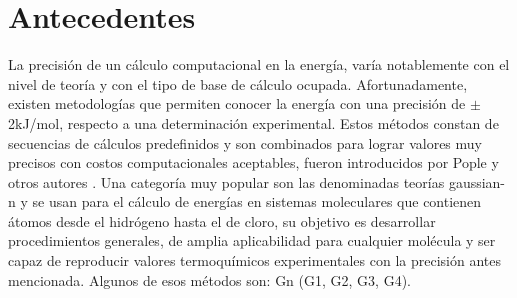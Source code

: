 \documentclass[12pt]{article}
\begin{document}
\section*{Antecedentes}
La precisión de un cálculo computacional en la energía, varía notablemente con el nivel de teoría y con el tipo de base de cálculo ocupada. Afortunadamente, existen metodologías que permiten conocer la energía con una precisión de $\pm$ 2kJ/mol, respecto a una determinación experimental. Estos métodos constan de secuencias de cálculos predefinidos y son combinados para lograr valores muy precisos con costos computacionales aceptables, fueron introducidos por Pople y otros autores \cite{Cuevas2003}. Una categoría muy popular son las denominadas teorías gaussian-n y se usan para el cálculo de energías en sistemas moleculares que contienen átomos desde el hidrógeno hasta el de cloro, su objetivo es desarrollar procedimientos generales, de amplia aplicabilidad para cualquier molécula y ser capaz de reproducir valores termoquímicos experimentales con la precisión antes mencionada. Algunos de esos métodos son: Gn (G1, G2, G3, G4). \\
\end{document}
